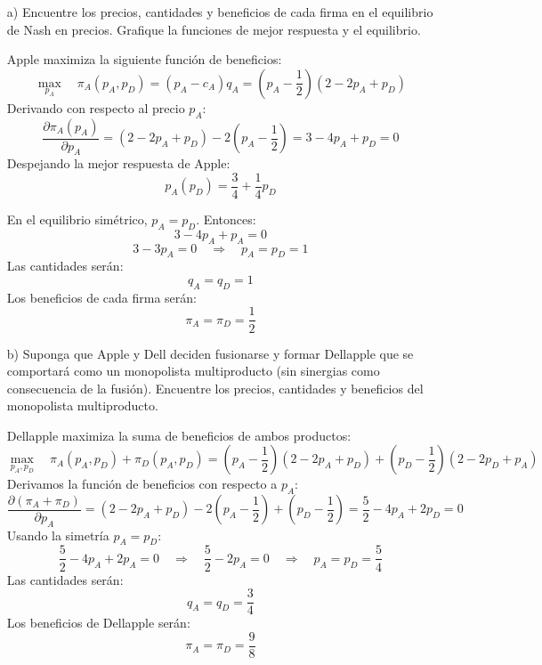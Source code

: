 \documentclass{exam}
\begin{document}
\begin{itemize}
    \item[a)] Encuentre los precios, cantidades y beneficios de cada firma en el equilibrio de Nash en precios. Grafique la funciones de mejor respuesta y el equilibrio.
    \begin{solution}
        Apple maximiza la siguiente función de beneficios:
        \[
        \max_{p_A} \quad \pi_A(p_A, p_D) = (p_A - c_A) q_A = (p_A - \frac{1}{2}) (2 - 2 p_A + p_D)
        \]
        Derivando con respecto al precio \(p_A\):
        \[
        \frac{\partial \pi_A(p_A)}{\partial p_A} = (2 - 2 p_A + p_D) - 2(p_A - \frac{1}{2}) = 3 - 4 p_A + p_D = 0
        \]
        Despejando la mejor respuesta de Apple:
        \[
        p_A(p_D) = \frac{3}{4} + \frac{1}{4} p_D
        \]

        En el equilibrio simétrico, \( p_A = p_D \). Entonces:
        \[
        3 - 4 p_A + p_A = 0
        \]
        \[
        3 - 3 p_A = 0 \quad \Rightarrow \quad p_A = p_D = 1
        \]
        Las cantidades serán:
        \[
        q_A = q_D = 1
        \]
        Los beneficios de cada firma serán:
        \[
        \pi_A = \pi_D = \frac{1}{2}
        \]
    \end{solution}

    \item[b)] Suponga que Apple y Dell deciden fusionarse y formar Dellapple que se comportará como un monopolista multiproducto (sin sinergias como consecuencia de la fusión). Encuentre los precios, cantidades y beneficios del monopolista multiproducto.
    \begin{solution}
        Dellapple maximiza la suma de beneficios de ambos productos:
        \[
        \max_{p_A, p_D} \quad \pi_A(p_A, p_D) + \pi_D(p_A, p_D) = (p_A - \frac{1}{2}) (2 - 2 p_A + p_D) + (p_D - \frac{1}{2}) (2 - 2 p_D + p_A)
        \]
        Derivamos la función de beneficios con respecto a \(p_A\):
        \[
        \frac{\partial (\pi_A + \pi_D)}{\partial p_A} = (2 - 2 p_A + p_D) - 2(p_A - \frac{1}{2}) + (p_D - \frac{1}{2}) = \frac{5}{2} - 4 p_A + 2 p_D = 0
        \]
        Usando la simetría \( p_A = p_D \):
        \[
        \frac{5}{2} - 4 p_A + 2 p_A = 0 \quad \Rightarrow \quad \frac{5}{2} - 2 p_A = 0 \quad \Rightarrow \quad p_A = p_D = \frac{5}{4}
        \]
        Las cantidades serán:
        \[
        q_A = q_D = \frac{3}{4}
        \]
        Los beneficios de Dellapple serán:
        \[
        \pi_A = \pi_D = \frac{9}{8}
        \]
    \end{solution}


\end{itemize}
\end{document}
